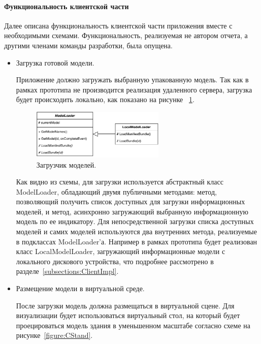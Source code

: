 ﻿\paragraph{Функциональность клиентской части}

Далее описана функциональность клиентской части приложения
вместе с необходимыми схемами.
Функциональность, реализуемая не автором отчета,
а другими членами команды разработки, была опущена.

\begin{itemize}
    \item {
        Загрузка готовой модели.

        Приложение должно загружать выбранную упакованную модель.
        Так как в рамках прототипа не производится реализация удаленного сервера,
        загрузка будет происходить локально, как показано на рисунке~%
        \ref{figure:CModelLoader}.

        \begin{figure}[!htp]
            \centering
            \includegraphics[width=0.6\textwidth]{images/UML-CModelLoader.pdf}
            \caption{Загрузчик моделей.}
            \label{figure:CModelLoader}
        \end{figure}

        Как видно из схемы, для загрузки используется абстрактный класс ModelLoader,
        обладающий двумя публичными методами: метод, позволяющий получить список
        доступных для загрузки информационных моделей, и метод,
        асинхронно загружающий выбранную информационную модель по ее индикатору.
        Для непосредственной загрузки списка доступных моделей и самих моделей
        используются два внутренних метода, реализуемые в подклассах ModelLoader'а.
        Например в рамках прототипа будет реализован класс LocalModelLoader,
        загружающий информационные модели с локального дискового устройства,
        что подробнее рассмотрено в разделе~\ref{subsections:ClientImpl}.
    } 
    \item {
        Размещение модели в виртуальной среде.

        После загрузки модель должна размещаться в виртуальной сцене.
        Для визуализации будет использоваться виртуальный стол,
        на который будет проецироваться модель здания
        в уменьшенном масштабе согласно схеме на рисунке~\ref{figure:CStand}.

}
\end{itemize}
